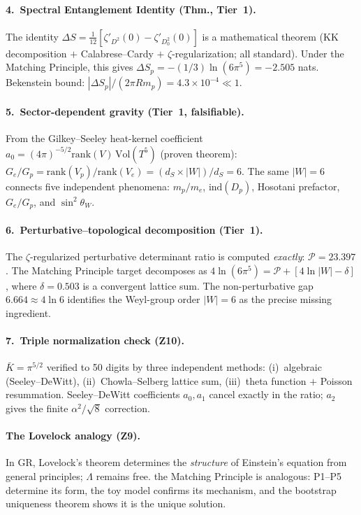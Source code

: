 \documentclass[11pt,a4paper]{article}
\begin{document}
\paragraph{4.\ Spectral Entanglement Identity (Thm., Tier~1).}
The identity $\Delta S = \tfrac{1}{12}[\zeta'_{D^2}(0)-\zeta'_{D_0^2}(0)]$
is a mathematical theorem (KK decomposition $+$ Calabrese--Cardy $+$
$\zeta$-regularization; all standard).
Under the Matching Principle, this gives $\Delta S_p=-(1/3)\ln(6\pi^5)=-2.505$ nats.
Bekenstein bound: $|\Delta S_p|/(2\pi R m_p) = 4.3\times10^{-4}\ll 1$.

\paragraph{5.\ Sector-dependent gravity (Tier~1, falsifiable).}
From the Gilkey--Seeley heat-kernel coefficient
$a_0=(4\pi)^{-5/2}\mathrm{rank}(V)\,\mathrm{Vol}(T^5)$
(proven theorem):
$G_e/G_p = \mathrm{rank}(V_p)/\mathrm{rank}(V_e) = (d_S\times|W|)/d_S = 6$.
The same $|W|=6$ connects five independent phenomena: $m_p/m_e$,
$\mathrm{ind}(D_p)$, Hosotani prefactor, $G_e/G_p$, and $\sin^2\theta_W$.

\paragraph{6.\ Perturbative--topological decomposition (Tier~1).}
The $\zeta$-regularized perturbative determinant ratio is computed
\emph{exactly}: $\mathcal{P}=23.397$. The Matching Principle target decomposes as
$4\ln(6\pi^5) = \mathcal{P} + [4\ln|W|-\delta]$, where $\delta=0.503$
is a convergent lattice sum. The non-perturbative gap $6.664\approx 4\ln 6$
identifies the Weyl-group order $|W|=6$ as the precise missing ingredient.

\paragraph{7.\ Triple normalization check (Z10).}
$\bar K = \pi^{5/2}$ verified to 50 digits by three independent methods:
(i)~algebraic (Seeley--DeWitt),
(ii)~Chowla--Selberg lattice sum,
(iii)~theta function $+$ Poisson resummation.
Seeley--DeWitt coefficients $a_0,a_1$ cancel exactly in the ratio;
$a_2$ gives the finite $\alpha^2/\!\sqrt{8}$ correction.

\paragraph{The Lovelock analogy (Z9).}
In GR, Lovelock's theorem determines the \emph{structure} of Einstein's
equation from general principles; $\Lambda$ remains free.
the Matching Principle is analogous: P1--P5 determine its form, the toy model confirms
its mechanism, and the bootstrap uniqueness theorem shows it is the
unique solution.
\end{document}
